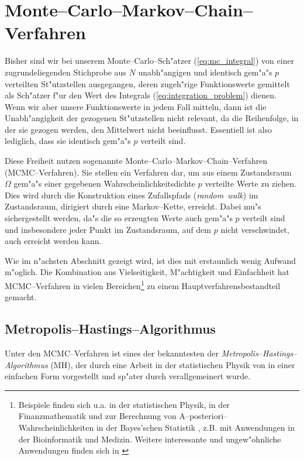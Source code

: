 	\section{Monte--Carlo--Markov--Chain--Verfahren}
	Bisher sind wir bei unserem Monte--Carlo--Sch"atzer (\ref{eq:mc_integral}) von einer zugrundeliegenden Stichprobe aus $N$ unabh"angigen und identisch gem"a"s $p$ verteilten St"utzstellen ausgegangen, deren zugeh"rige Funktionswerte gemittelt als Sch"atzer f"ur den Wert des Integrals (\ref{eq:integration_problem}) dienen. Wenn wir aber unsere Funktionswerte in jedem Fall mitteln, dann ist die Unabh"angigkeit der gezogenen St"utzstellen nicht relevant, da die Reihenfolge, in der sie gezogen werden, den Mittelwert nicht beeinflusst. Essentiell ist also lediglich, dass sie identisch gem"a"s $p$ verteilt sind.
	
	Diese Freiheit nutzen sogenannte Monte--Carlo--Markov--Chain--Verfahren (MCMC--Verfahren). Sie stellen ein Verfahren dar, um aus einem Zustandsraum $\Omega$ gem"a"s einer gegebenen Wahrscheinlichkeitsdichte $p$ verteilte Werte zu ziehen. Dies wird durch die Konstruktion eines Zufallspfads ({\em random~walk}) im Zustandsraum, dirigiert durch eine Markov--Kette, erreicht. Dabei mu"s sichergestellt werden, da"s die so erzeugten Werte auch gem"a"s $p$ verteilt sind und insbesondere jeder Punkt im Zustandsraum, auf dem $p$ nicht verschwindet, auch erreicht werden kann.
	
	Wie im n"achsten Abschnitt gezeigt wird, ist dies mit erstaunlich wenig Aufwand m"oglich. Die Kombination aus Vielseitigkeit, M"achtigkeit und Einfachheit hat MCMC--Verfahren in vielen Bereichen\footnote{Beispiele finden sich u.a. in der statistischen Physik, in der Finanzmathematik und zur Berechnung von A--posteriori--Wahrscheinlichkeiten in der Bayes'schen Statistik \citep{Geweke:1989p10465}, z.B. mit Anwendungen in der Bioinformatik und Medizin. Weitere interessante und ungew"ohnliche Anwendungen finden sich in \citep{Diaconis:2009p4122}} zu einem Hauptverfahrensbestandteil gemacht.
	
	
	\subsection{Metropolis--Hastings--Algorithmus}
	Unter den MCMC--Verfahren ist eines der bekanntesten der {\em Metropolis--Hastings--Algorithmus} (MH), der durch eine Arbeit in der statistischen Physik von \citet{Metropolis:1953p3364} in einer einfachen Form vorgestellt und sp"ater durch \citet{Hastings:1970p3387} verallgemeinert wurde.

